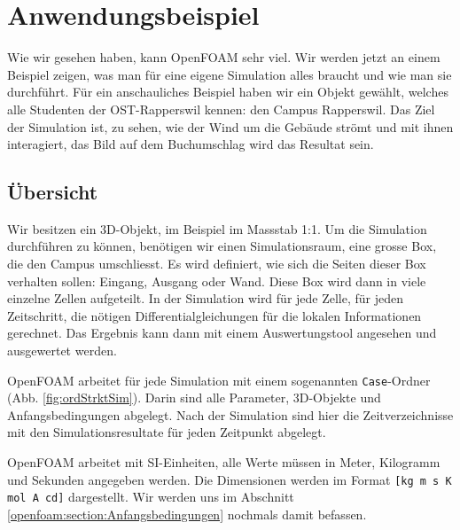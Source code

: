 %
%
%
%
\section{Anwendungsbeispiel
\label{openfoam:section:Anwendungsbeispiel}}
Wie wir gesehen haben, kann OpenFOAM sehr viel.
Wir werden jetzt an einem Beispiel zeigen, was man für eine eigene Simulation alles braucht und wie man sie durchführt.
Für ein anschauliches Beispiel haben wir ein Objekt gewählt, welches alle Studenten der OST-Rapperswil kennen: den Campus Rapperswil.
Das Ziel der Simulation ist, zu sehen, wie der Wind um die Gebäude strömt und mit ihnen interagiert, das Bild auf dem Buchumschlag wird das Resultat sein.

\subsection{Übersicht \label{openfoam:section:Übersicht}}
Wir besitzen ein 3D-Objekt, im Beispiel im Massstab 1:1.
Um die Simulation durchführen zu können, benötigen wir einen Simulationsraum, eine grosse Box, die den Campus umschliesst.
Es wird definiert, wie sich die Seiten dieser Box verhalten sollen: Eingang, Ausgang oder Wand.
Diese Box wird dann in viele einzelne Zellen aufgeteilt.
In der Simulation wird für jede Zelle, für jeden Zeitschritt, 
die nötigen Differentialgleichungen für die lokalen Informationen gerechnet.
Das Ergebnis kann dann mit einem Auswertungstool angesehen und ausgewertet werden.

OpenFOAM arbeitet für jede Simulation mit einem sogenannten \texttt{Case}-Ordner (Abb. \ref{fig:ordStrktSim}). 
Darin sind alle Parameter, 3D-Objekte und Anfangsbedingungen abgelegt.
Nach der Simulation sind hier die Zeitverzeichnisse mit den Simulationsresultate für jeden Zeitpunkt abgelegt.

OpenFOAM arbeitet mit SI-Einheiten, alle Werte müssen in Meter, Kilogramm und Sekunden angegeben werden. 
Die Dimensionen werden im Format \texttt{[kg m s K mol A cd]} dargestellt.
Wir werden uns im Abschnitt \ref{openfoam:section:Anfangsbedingungen} nochmals damit befassen.

